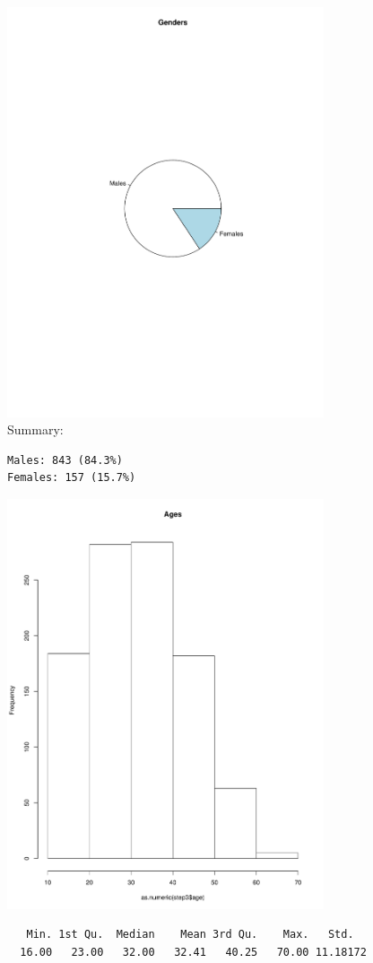 \documentclass{article}
\begin{document}
\includegraphics[width=0.7\textwidth]{Genders.pdf}\\
Summary:\\
\begin{verbatim}
Males: 843 (84.3%)
Females: 157 (15.7%)
\end{verbatim}
\includegraphics[width=0.7\textwidth]{Ages.pdf}\\
\begin{verbatim}
   Min. 1st Qu.  Median    Mean 3rd Qu.    Max.   Std.
  16.00   23.00   32.00   32.41   40.25   70.00 11.18172
\end{verbatim}
\end{document}
